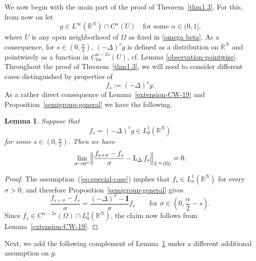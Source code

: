 \documentclass[notitlepage,11pt,reqno]{amsart}
\newtheorem{lemma}[theorem]{Lemma}
\theoremstyle{definition}
\numberwithin{equation}{section}
\newcommand{\loc}{\mathrm{loc}}
\newcommand{\R}{\mathds{R}}
\newcommand{\RR}{\mathds{R}}
\DeclareMathOperator{\loglap}{L_{\Delta}}
\newcommand{\id}{\bm{I}}
\begin{document}
We now begin with the main part of the proof of Theorem~\ref{thm1.3}. For this, from now on let
\begin{equation}
  \label{eq:main-assumption-g-differentiability}
g\in L^{\infty}(\RR^N) \cap C^{\alpha}(U)\quad\text{for some $\alpha\in(0,1]$,}
\end{equation}
where $U$ is any open neighborhood of $\Omega$ as fixed in \eqref{omega beta}. As a consequence, for $s\in(0,\frac\alpha{2})$, $(-\Delta)^{s}g$ is defined as a distribution on $\R^N$ and pointwisely as a function in $C^{\alpha-2s}_{\loc}(U)$, cf. Lemma \ref{observation-pointwise}.
Throughout the proof of Theorem~\ref{thm1.3}, we will need to consider different cases distinguished by properties of \begin{equation}
  \label{eq:special-caseb}
f_s:=(-\Delta)^sg.
\end{equation}
As a rather direct consequence of Lemma~\ref{extension-CW-19} and Proposition~\ref{semigroup-general} we have the following.   

\begin{lemma}
\label{diff-express-f-s}
Suppose that 
\begin{equation}
 \label{eq:special-case}
f_s = (-\Delta)^sg \in L^1_{0}(\R^N) 
\end{equation}
for some $s \in (0,\frac{\alpha}{2})$. Then we have 
  \begin{equation*}
    \label{diff-f-s}
  \lim_{\sigma \to 0^+} \Bigl\|\frac{f_{s+\sigma}-f_s}{\sigma}-\loglap f_s\Bigr\|_{L^\infty(\Omega)} = 0.
  \end{equation*}
\end{lemma}

\begin{proof}
The assumption~(\ref{eq:special-case}) implies that $f_s \in L^1_{\sigma}(\R^N)$ for every $\sigma>0$, and therefore Proposition~\ref{semigroup-general} gives 
$$
  \frac{f_{s+\sigma}-f_s}{\sigma} = \frac{(-\Delta)^{\sigma} - \id}{\sigma}f_s \qquad \text{for $\sigma \in (0,\frac{\alpha}{2}-s)$.}
$$
Since $f_s \in C^{\alpha-2s}(\Omega) \cap L^1_0(\R^N)$, the claim now follows from Lemma~\ref{extension-CW-19}. 
\end{proof}


Next, we add the following complement of Lemma~\ref{diff-express-f-s} under a different additional assumption on $g$. 
\end{document}
